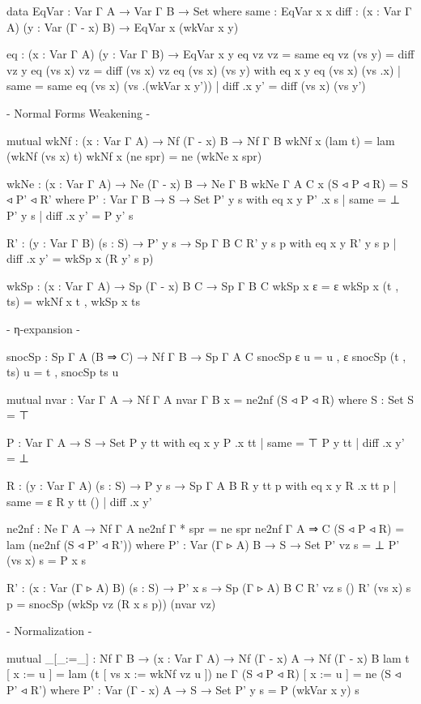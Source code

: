 \begin{code}
data EqVar : Var Γ A → Var Γ B → Set where
  same : EqVar x x
  diff : (x : Var Γ A) (y : Var (Γ - x) B) → EqVar x (wkVar x y)

eq : (x : Var Γ A) (y : Var Γ B) → EqVar x y
eq vz vz = same
eq vz (vs y) = diff vz y
eq (vs x) vz = diff (vs x) vz
eq (vs x) (vs y) with eq x y
eq (vs x) (vs .x)          | same = same
eq (vs x) (vs .(wkVar x y')) | diff .x y' = diff (vs x) (vs y')

{- Normal Forms Weakening -}

mutual
  wkNf : (x : Var Γ A) → Nf (Γ - x) B → Nf Γ B
  wkNf x (lam t) = lam (wkNf (vs x) t)
  wkNf x (ne spr) = ne (wkNe x spr)

  wkNe : (x : Var Γ A) → Ne (Γ - x) B → Ne Γ B
  wkNe {Γ} {A} {C} x (S ◃ P ◃ R) = S ◃ P' ◃ R'
    where
    P' : Var Γ B → S → Set
    P' y  s with eq x y
    P' .x s | same = ⊥
    P' y  s | diff .x y' = P y' s

    R' : (y : Var Γ B) (s : S) → P' y s → Sp Γ B C
    R' y s p with eq x y
    R' y s p | diff .x y' = wkSp x (R y' s p)

  wkSp : (x : Var Γ A) → Sp (Γ - x) B C → Sp Γ B C
  wkSp x ε = ε
  wkSp x (t , ts) = wkNf x t , wkSp x ts

{- η-expansion -}

snocSp : Sp Γ A (B ⇒ C) → Nf Γ B → Sp Γ A C
snocSp ε u = u , ε
snocSp (t , ts) u = t , snocSp ts u

mutual
  nvar : Var Γ A → Nf Γ A
  nvar {Γ} {B} x = ne2nf (S ◃ P ◃ R)
    where
    S : Set
    S = ⊤

    P : Var Γ A → S → Set
    P y  tt with eq x y
    P .x tt | same = ⊤
    P y  tt | diff .x y' = ⊥

    R : (y : Var Γ A) (s : S) → P y s → Sp Γ A B
    R y tt p with eq x y
    R .x tt p | same = ε
    R y tt () | diff .x y'

  ne2nf : Ne Γ A → Nf Γ A
  ne2nf {Γ} {*} spr = ne spr
  ne2nf {Γ} {A ⇒ C} (S ◃ P ◃ R) = lam (ne2nf (S ◃ P' ◃ R'))
    where
    P' : Var (Γ ▹ A) B → S → Set
    P' vz s = ⊥
    P' (vs x) s = P x s

    R' : (x : Var (Γ ▹ A) B) (s : S) → P' x s → Sp (Γ ▹ A) B C
    R' vz s ()
    R' (vs x) s p = snocSp (wkSp vz (R x s p)) (nvar vz)

{- Normalization -}

mutual
  _[_:=_] : Nf Γ B → (x : Var Γ A) → Nf (Γ - x) A → Nf (Γ - x) B
  lam t [ x := u ] = lam (t [ vs x := wkNf vz u ])
  ne {Γ} (S ◃ P ◃ R) [ x := u ] = ne (S ◃ P' ◃ R')
    where
    P' : Var (Γ - x) A → S → Set
    P' y s = P (wkVar x y) s


\end{code}
